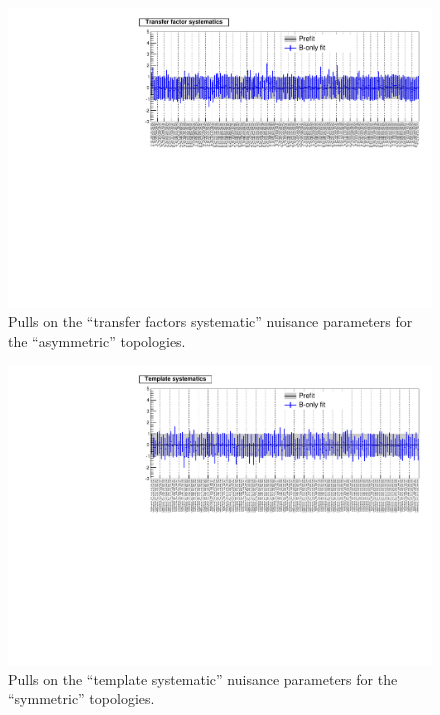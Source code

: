 \newpage
\begin{landscape}
\begin{figure}[h!]
\caption{Pulls on the ``transfer factors systematic'' nuisance parameters for the ``asymmetric'' topologies.\label{fig:nuisPull_TF_asym}}
    \includegraphics[width=\linewidth]{figures/postFitResults/nuisances/TF_asym_ALL_nuisances.pdf}
\end{figure}
\end{landscape}



\newpage
\begin{landscape}
\begin{figure}[h!]
\caption{Pulls on the ``template systematic'' nuisance parameters for the ``symmetric'' topologies.\label{fig:nuisPull_template_sym}}
    \includegraphics[width=\linewidth]{figures/postFitResults/nuisances/template_sym_ALL_nuisances.pdf}
\end{figure}
\end{landscape}



